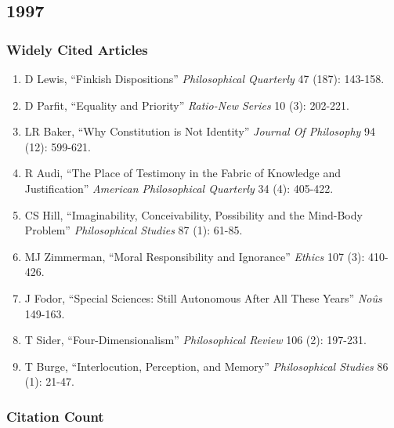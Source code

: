 \documentclass[
  10pt,
  letterpaper,
  DIV=11,
  numbers=noendperiod,
  twoside]{scrartcl}
\providecommand{\tightlist}{%
  \setlength{\itemsep}{0pt}\setlength{\parskip}{0pt}}\usepackage{longtable,booktabs,array}
\begin{document}
\newpage

\subsection{1997}\label{section-21}

\subsubsection*{Widely Cited Articles}\label{widely-cited-articles-21}

\begin{enumerate}
\def\labelenumi{\arabic{enumi}.}
\tightlist
\item
  D Lewis, ``Finkish Dispositions'' \emph{Philosophical Quarterly} 47
  (187): 143-158.
\item
  D Parfit, ``Equality and Priority'' \emph{Ratio-New Series} 10 (3):
  202-221.
\item
  LR Baker, ``Why Constitution is Not Identity'' \emph{Journal Of
  Philosophy} 94 (12): 599-621.
\item
  R Audi, ``The Place of Testimony in the Fabric of Knowledge and
  Justification'' \emph{American Philosophical Quarterly} 34 (4):
  405-422.
\item
  CS Hill, ``Imaginability, Conceivability, Possibility and the
  Mind-Body Problem'' \emph{Philosophical Studies} 87 (1): 61-85.
\item
  MJ Zimmerman, ``Moral Responsibility and Ignorance'' \emph{Ethics} 107
  (3): 410-426.
\item
  J Fodor, ``Special Sciences: Still Autonomous After All These Years''
  \emph{Noûs} 149-163.
\item
  T Sider, ``Four-Dimensionalism'' \emph{Philosophical Review} 106 (2):
  197-231.
\item
  T Burge, ``Interlocution, Perception, and Memory'' \emph{Philosophical
  Studies} 86 (1): 21-47.
\end{enumerate}

\subsubsection*{Citation Count}\label{citation-count-21}
\end{document}
